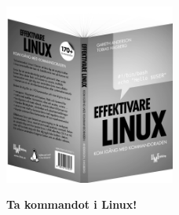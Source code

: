\documentclass[a4paper,final]{memoir} %
\begin{document}
\newcommand{\xlistskip}{\vspace*{.25\baselineskip}}
\newcommand{\xlistrule}{\xlistskip\vskip-1.3pt\hrule\xlistskip\vskip2pt}
\newcommand{\bitem}[1]{\noindent{#1}\vskip.25\baselineskip\xlistrule}

\newlength{\bitemadjust}
\setlength{\bitemadjust}{1.5\baselineskip plus 1\baselineskip minus .75\baselineskip}

\newenvironment{booklist}{\xlistrule}{
\vskip\bitemadjust
}

\newcommand\pitem{\vspace*{.25\baselineskip}\item[\strut\color{lightgrey}{$\blacktriangleright$}]}

\vspace*{0pt plus 2fill}

\begin{center}

\noindent\includegraphics[width=56mm]{bilder804-all/el-reklam}

\end{center}

\medskip

\vspace*{0pt plus 1fill}

\noindent\textbf{\huge Ta kommandot i Linux!}
\end{document}
